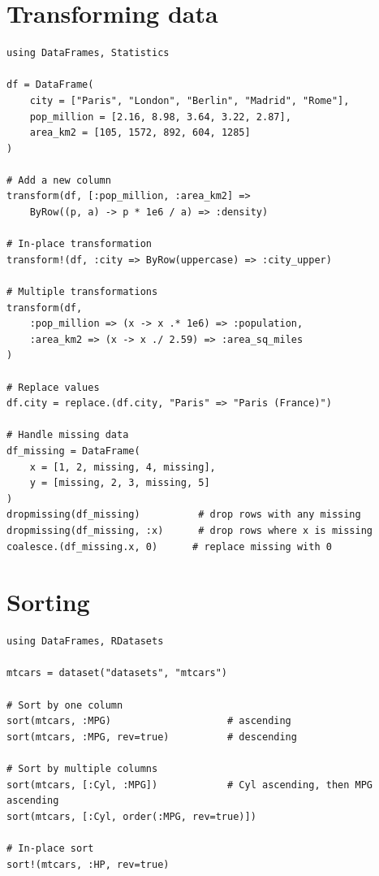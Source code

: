 \section{Transforming data}

\begin{verbatim}
using DataFrames, Statistics

df = DataFrame(
    city = ["Paris", "London", "Berlin", "Madrid", "Rome"],
    pop_million = [2.16, 8.98, 3.64, 3.22, 2.87],
    area_km2 = [105, 1572, 892, 604, 1285]
)

# Add a new column
transform(df, [:pop_million, :area_km2] =>
    ByRow((p, a) -> p * 1e6 / a) => :density)

# In-place transformation
transform!(df, :city => ByRow(uppercase) => :city_upper)

# Multiple transformations
transform(df,
    :pop_million => (x -> x .* 1e6) => :population,
    :area_km2 => (x -> x ./ 2.59) => :area_sq_miles
)

# Replace values
df.city = replace.(df.city, "Paris" => "Paris (France)")

# Handle missing data
df_missing = DataFrame(
    x = [1, 2, missing, 4, missing],
    y = [missing, 2, 3, missing, 5]
)
dropmissing(df_missing)          # drop rows with any missing
dropmissing(df_missing, :x)      # drop rows where x is missing
coalesce.(df_missing.x, 0)      # replace missing with 0
\end{verbatim}

\section{Sorting}

\begin{verbatim}
using DataFrames, RDatasets

mtcars = dataset("datasets", "mtcars")

# Sort by one column
sort(mtcars, :MPG)                    # ascending
sort(mtcars, :MPG, rev=true)          # descending

# Sort by multiple columns
sort(mtcars, [:Cyl, :MPG])            # Cyl ascending, then MPG ascending
sort(mtcars, [:Cyl, order(:MPG, rev=true)])

# In-place sort
sort!(mtcars, :HP, rev=true)
\end{verbatim}

